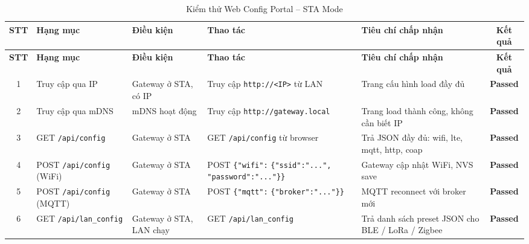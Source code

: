         \begin{longtable}{|c|p{3cm}|p{2cm}|p{4cm}|p{3cm}|c|}
            \caption{Kiểm thử Web Config Portal -- STA Mode}
            \label{tab:test_web_config_sta} \\
            \hline
            \textbf{STT} & \textbf{Hạng mục} & \textbf{Điều kiện} & \textbf{Thao tác} & \textbf{Tiêu chí chấp nhận} & \textbf{Kết quả} \\ \hline
            \endfirsthead
            \hline
            \textbf{STT} & \textbf{Hạng mục} & \textbf{Điều kiện} & \textbf{Thao tác} & \textbf{Tiêu chí chấp nhận} & \textbf{Kết quả} \\ \hline
            \endhead
            \hline
            \endfoot
            \endlastfoot

            1 & Truy cập qua IP & Gateway ở STA, có IP & Truy cập \texttt{http://<IP>} từ LAN & Trang cấu hình load đầy đủ & \textcolor{modern_blue}{\textbf{Passed}} \\ \hline

            2 & Truy cập qua mDNS & mDNS hoạt động & Truy cập \texttt{http://}\newline\texttt{gateway.local} & Trang load thành công, không cần biết IP & \textcolor{modern_blue}{\textbf{Passed}} \\ \hline

            3 & GET \texttt{/api/config} & Gateway ở STA & GET \texttt{/api/config} từ browser & Trả JSON đầy đủ: wifi, lte, mqtt, http, coap & \textcolor{modern_blue}{\textbf{Passed}} \\ \hline

            4 & POST \texttt{/api/config} (WiFi) & Gateway ở STA & POST \newline\texttt{\{"wifi":} \newline\texttt{\{"ssid":"...",} \newline\texttt{"password":"..."\}\}} & Gateway cập nhật WiFi, NVS save & \textcolor{modern_blue}{\textbf{Passed}} \\ \hline

            5 & POST \texttt{/api/config} (MQTT) & Gateway ở STA & POST \newline\texttt{\{"mqtt":} \newline\texttt{\{"broker":"..."\}\}} & MQTT reconnect với broker mới & \textcolor{modern_blue}{\textbf{Passed}} \\ \hline

            6 & GET \texttt{/api/lan\_config} & Gateway ở STA, LAN chạy & GET \newline\texttt{/api/lan\_config} & Trả danh sách preset JSON cho BLE / LoRa / Zigbee & \textcolor{modern_blue}{\textbf{Passed}} \\ \hline


\end{longtable}
